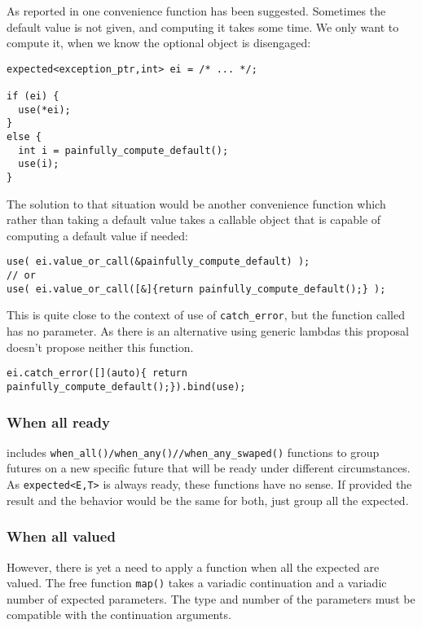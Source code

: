 \documentclass[a4paper,10pt]{article}
\newcommand{\cpp}[1]{\lstinline{#1}}
\begin{document}
As reported in \cite{OPTIONAL_R5} one  convenience function has been suggested. Sometimes the default value is not given, and computing it takes some time. We only want to compute it, when we know the optional object is disengaged:

\begin{lstlisting}
expected<exception_ptr,int> ei = /* ... */;

if (ei) {
  use(*ei);
}
else {
  int i = painfully_compute_default();
  use(i);
}
\end{lstlisting}

The solution to that situation would be another convenience function which rather than taking a default value takes a callable object that is capable of computing a default value if needed:

\begin{lstlisting}
use( ei.value_or_call(&painfully_compute_default) );       
// or
use( ei.value_or_call([&]{return painfully_compute_default();} );
\end{lstlisting}

This is quite close to the context of use of  \cpp{catch_error}, but the function called has no parameter. As there is an alternative using generic lambdas this proposal doesn't propose neither this function.

\begin{lstlisting}
ei.catch_error([](auto){ return painfully_compute_default();}).bind(use);       
\end{lstlisting}

\subsubsection{When all ready}

 \cite{ImprovementsAsync} includes \cpp{when_all()/when_any()//when_any_swaped()} functions to group futures on a new specific future that will be ready under different circumstances. As \cpp{expected<E,T>} is always ready, these functions have no sense. If provided the result and the behavior would be the same for both, just group all the expected.  
 
\subsubsection{When all valued}

However, there is yet a need to apply a function when all the expected are valued. The free function \cpp{map()} takes a variadic continuation and a variadic number of expected parameters. The type and number of the parameters must be compatible with the continuation arguments.
\end{document}
